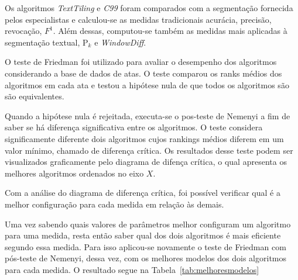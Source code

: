 Os algoritmos \textit{TextTiling} e \textit{C99} foram comparados com a segmentação fornecida pelos especialistas e calculou-se as medidas tradicionais acurácia, precisão, revocação, $F^1$. Além dessas, computou-se também as medidas mais aplicadas à segmentação textual, P$_k$ e \textit{WindowDiff}.



%
O teste de Friedman foi utilizado para avaliar o desempenho dos algoritmos considerando a base de dados de atas. 
%
O teste comparou os ranks médios dos algoritmos em cada ata e testou a hipótese nula de que todos os algoritmos são são equivalentes. 

%
Quando a hipótese nula é rejeitada, executa-se o pos-teste de Nemenyi a fim de saber se há diferença significativa entre os algoritmos. O teste considera significamente diferente dois algoritmos cujos rankings médios diferem em um valor mínimo, chamado de diferença crítica.
%
Os resultados desse teste podem ser visualizados graficamente pelo diagrama de difença crítica, o qual apresenta os melhores algoritmos ordenados no eixo $X$.


%
Com a análise do diagrama de diferença crítica, foi possível verificar qual é a melhor configuração para cada medida em relação às demais.





Uma vez sabendo quais valores de parâmetros melhor configuram um algoritmo para uma medida, resta então saber qual dos dois algoritmos é mais eficiente segundo essa medida. Para isso aplicou-se novamente o teste de Friedman com pós-teste de Nemenyi, dessa vez, com os melhores modelos dos dois algoritmos para cada medida. O resultado segue na Tabela~\ref{tab:melhoresmodelos}


